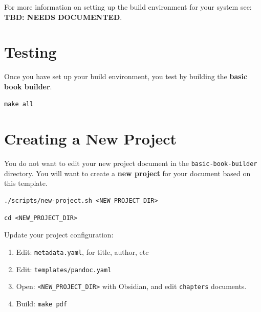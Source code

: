 \documentclass[
  12pt,
  openany]{book}
\providecommand{\tightlist}{%
  \setlength{\itemsep}{0pt}\setlength{\parskip}{0pt}}
\begin{document}
For more information on setting up the build environment for your system
see: \textbf{TBD: NEEDS DOCUMENTED}.

\section{Testing}\label{testing}

Once you have set up your build environment, you test by building the
\textbf{basic book builder}.

\begin{clibox}
\begin{verbatim}
make all
\end{verbatim}

\end{clibox}

\section{Creating a New Project}\label{creating-a-new-project}

\begin{proposedbox}[Tip]
You do not want to edit your new project document in the
\texttt{basic-book-builder} directory. You will want to create a
\textbf{new project} for your document based on this template.
\end{proposedbox}

\begin{clibox}
\begin{verbatim}
./scripts/new-project.sh <NEW_PROJECT_DIR>
\end{verbatim}

\end{clibox}

\begin{verbatim}
cd <NEW_PROJECT_DIR>
\end{verbatim}

Update your project configuration:

\begin{enumerate}
\def\labelenumi{\arabic{enumi}.}
\tightlist
\item
  Edit: \texttt{metadata.yaml}, for title, author, etc
\item
  Edit: \texttt{templates/pandoc.yaml}
\item
  Open: \texttt{\textless{}NEW\_PROJECT\_DIR\textgreater{}} with
  Obsidian, and edit \texttt{chapters} documents.
\item
  Build: \texttt{make\ pdf}
\end{enumerate}
\end{document}
